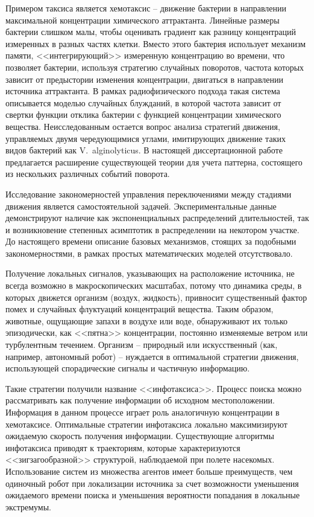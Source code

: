 Примером таксиса является хемотаксис -- движение бактерии в направлении максимальной концентрации химического аттрактанта. Линейные размеры бактерии слишком малы, чтобы оценивать градиент как разницу концентраций измеренных в разных частях клетки. Вместо этого бактерия использует механизм памяти, <<интегрирующий>> измеренную концентрацию во времени, что позволяет бактерии, используя стратегию случайных поворотов, частота которых зависит от предыстории изменения концентрации, двигаться в направлении источника аттрактанта. В рамках радиофизического подхода такая система описывается моделью случайных блужданий, в которой частота зависит от свертки функции отклика бактерии с функцией концентрации химического вещества. Неисследованным остается вопрос анализа стратегий движения, управляемых двумя чередующимися углами, имитирующих движение таких видов бактерий как V.~alginolyticus. В настоящей диссертационной работе предлагается расширение существующей теории для учета паттерна, состоящего из нескольких различных событий поворота.

Исследование закономерностей управления переключениями между стадиями движения является самостоятельной задачей. Экспериментальные данные демонстрируют наличие как экспоненциальных распределений длительностей, так и возникновение степенных асимптотик в распределении на некотором участке. До настоящего времени описание базовых механизмов, стоящих за подобными закономерностями, в рамках простых математических моделей отсутствовало.

Получение локальных сигналов, указывающих на расположение источника, не всегда возможно в макроскопических масштабах, потому что динамика среды, в которых движется организм (воздух, жидкость), привносит существенный фактор помех и случайных флуктуаций концентраций вещества. Таким образом, животные, ощущающие запахи в воздухе или воде, обнаруживают их только эпизодически, как <<пятна>> концентрации, постоянно изменяемые ветром или турбулентным течением. Организм -- природный или искусственный (как, например, автономный робот) -- нуждается в оптимальной стратегии движения, использующей спорадические сигналы и частичную информацию.

Такие стратегии получили название <<инфотаксиса>>. Процесс поиска можно рассматривать как получение информации об исходном местоположении. Информация в данном процессе играет роль аналогичную концентрации в хемотаксисе. Оптимальные стратегии инфотаксиса локально максимизируют ожидаемую скорость получения информации. Существующие алгоритмы инфотаксиса приводят к траекториям, которые характеризуются <<зигзагообразной>> структурой, наблюдаемой при полете насекомых. Использование систем из множества агентов имеет больше преимуществ, чем одиночный робот при локализации источника за счет возможности уменьшения ожидаемого времени поиска и уменьшения вероятности попадания в локальные экстремумы.

